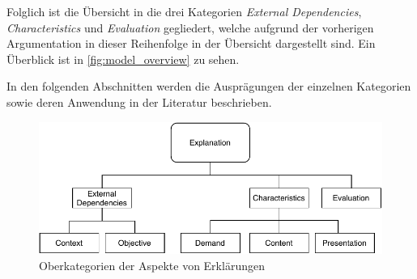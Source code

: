 \smallbreak

Folglich ist die Übersicht in die drei Kategorien \textit{External Dependencies}, \textit{Characteristics} und \textit{Evaluation} gegliedert, welche aufgrund der vorherigen Argumentation in dieser Reihenfolge in der Übersicht dargestellt sind. Ein Überblick ist in \autoref{fig:model_overview} zu sehen.

In den folgenden Abschnitten werden die Ausprägungen der einzelnen Kategorien sowie deren Anwendung in der Literatur beschrieben.

\begin{figure}[htb!]
    \begin{center}
        \includegraphics[width=0.9\linewidth]{contents/05_model_description/res/model-overview.pdf}
    \end{center}
    \caption{Oberkategorien der Aspekte von Erklärungen}
    \label{fig:model_overview}
\end{figure}